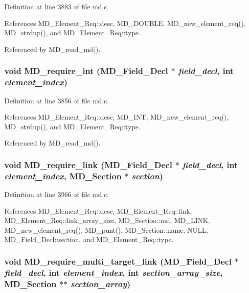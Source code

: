 Definition at line 3883 of file md.c.

References MD\_\-Element\_\-Req::desc, MD\_\-DOUBLE, MD\_\-new\_\-element\_\-req(), MD\_\-strdup(), and MD\_\-Element\_\-Req::type.

Referenced by MD\_\-read\_\-md().
\subsubsection{\setlength{\rightskip}{0pt plus 5cm}void MD\_\-require\_\-int (\bf{MD\_\-Field\_\-Decl} $\ast$ {\em field\_\-decl}, int {\em element\_\-index})}\label{md_8c_c62eab6c660919a2250857aaffaddebb}




Definition at line 3856 of file md.c.

References MD\_\-Element\_\-Req::desc, MD\_\-INT, MD\_\-new\_\-element\_\-req(), MD\_\-strdup(), and MD\_\-Element\_\-Req::type.

Referenced by MD\_\-read\_\-md().
\subsubsection{\setlength{\rightskip}{0pt plus 5cm}void MD\_\-require\_\-link (\bf{MD\_\-Field\_\-Decl} $\ast$ {\em field\_\-decl}, int {\em element\_\-index}, \bf{MD\_\-Section} $\ast$ {\em section})}\label{md_8c_cf268a6735d036c0166261196439a452}




Definition at line 3966 of file md.c.

References MD\_\-Element\_\-Req::desc, MD\_\-Element\_\-Req::link, MD\_\-Element\_\-Req::link\_\-array\_\-size, MD\_\-Section::md, MD\_\-LINK, MD\_\-new\_\-element\_\-req(), MD\_\-punt(), MD\_\-Section::name, NULL, MD\_\-Field\_\-Decl::section, and MD\_\-Element\_\-Req::type.
\subsubsection{\setlength{\rightskip}{0pt plus 5cm}void MD\_\-require\_\-multi\_\-target\_\-link (\bf{MD\_\-Field\_\-Decl} $\ast$ {\em field\_\-decl}, int {\em element\_\-index}, int {\em section\_\-array\_\-size}, \bf{MD\_\-Section} $\ast$$\ast$ {\em section\_\-array})}\label{md_8c_6db7feb559876c9ccc075a0756c4fb93}




